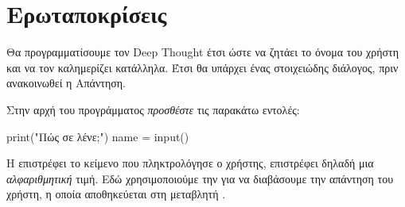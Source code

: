 \documentclass[a4paper,11pt,oneside]{book}
\begin{document}
\section{Ερωταποκρίσεις}

Θα προγραμματίσουμε τον Deep Thought έτσι ώστε να ζητάει το όνομα του χρήστη και να τον καλημερίζει κατάλληλα. Έτσι θα υπάρχει ένας στοιχειώδης διάλογος, πριν ανακοινωθεί η Απάντηση.

\begin{step}
\label{step:input}
Στην αρχή του προγράμματος \emph{προσθέστε} τις παρακάτω εντολές:

\begin{pynew}
print("Πώς σε λένε;")
name = input()
\end{pynew}

Η  επιστρέφει το κείμενο που πληκτρολόγησε ο χρήστης,
επιστρέφει δηλαδή μια \emph{αλφαριθμητική} τιμή. Εδώ χρησιμοποιούμε την
 για να διαβάσουμε την απάντηση του χρήστη, η οποία αποθηκεύεται στη μεταβλητή .

\end{step}
\end{document}
